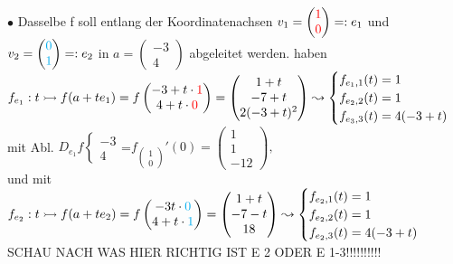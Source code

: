 \documentclass[]{scrartcl}
\begin{document}
	$\bullet$ Dasselbe f soll entlang der Koordinatenachsen $v_1=\begin{pmatrix}
		\textcolor{red}{1}\\\textcolor{red}{0}
	\end{pmatrix}=: e_1$ und $v_2 =\begin{pmatrix}
		\textcolor{cyan}{0}\\\textcolor{cyan}{1}
	\end{pmatrix}=:e_2$ in $ a= \begin{pmatrix}
		-3\\4
	\end{pmatrix}$ abgeleitet werden. haben $f_{e_1}:t \rightarrowtail f(a+t e_1)=f\begin{pmatrix}
		-3+t\cdot\textcolor{red}{1}\\4+t\cdot\textcolor{red}{0}
	\end{pmatrix}=\begin{pmatrix}
		1+t\\-7+t\\2(-3+t)^2
	\end{pmatrix}\leadsto\begin{cases}
	f_{e_1,1}(t)=1\\f_{e_2,2}(t)=1\\f_{e_3,3}(t)=4(-3+t)
	\end{cases}$\\
	mit Abl. \underline{\underline{$D_{e_1}f\begin{cases}
				-3\\4
			\end{cases}$}}=$f_{\begin{pmatrix}
		1\\0
	\end{pmatrix}}'(0)=\begin{pmatrix}
	1\\1\\-12
	\end{pmatrix},$\\
	und mit $f_{e_2}: t\rightarrowtail f(a+t e_2)=f\begin{pmatrix}
		-3t\cdot\textcolor{cyan}{0}\\4+t\cdot\textcolor{cyan}{1}
	\end{pmatrix}=\begin{pmatrix}
		1+t\\-7-t\\18
	\end{pmatrix}\leadsto\begin{cases}
	f_{e_2,1}(t)=1\\f_{e_2,2}(t)=1\\f_{e_2,3}(t)=4(-3+t)
	\end{cases}$\\SCHAU NACH WAS HIER RICHTIG IST E 2 ODER E 1-3!!!!!!!!!!\\
\end{document}
